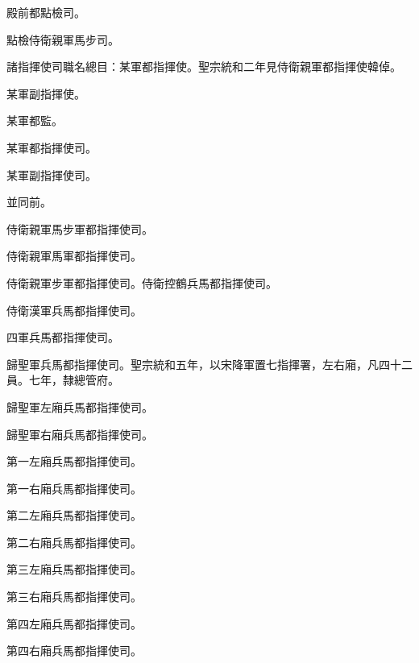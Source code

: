 \begin{pinyinscope}
 殿前都點檢司。



 點檢侍衛親軍馬步司。



 諸指揮使司職名總目：某軍都指揮使。聖宗統和二年見侍衛親軍都指揮使韓倬。



 某軍副指揮使。



 某軍都監。



 某軍都指揮使司。



 某軍副指揮使司。



 並同前。



 侍衛親軍馬步軍都指揮使司。



 侍衛親軍馬軍都指揮使司。



 侍衛親軍步軍都指揮使司。侍衛控鶴兵馬都指揮使司。



 侍衛漢軍兵馬都指揮使司。



 四軍兵馬都指揮使司。



 歸聖軍兵馬都指揮使司。聖宗統和五年，以宋降軍置七指揮署，左右廂，凡四十二員。七年，隸總管府。



 歸聖軍左廂兵馬都指揮使司。



 歸聖軍右廂兵馬都指揮使司。



 第一左廂兵馬都指揮使司。



 第一右廂兵馬都指揮使司。



 第二左廂兵馬都指揮使司。



 第二右廂兵馬都指揮使司。



 第三左廂兵馬都指揮使司。



 第三右廂兵馬都指揮使司。



 第四左廂兵馬都指揮使司。



 第四右廂兵馬都指揮使司。




\end{pinyinscope}
